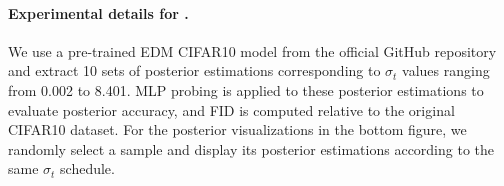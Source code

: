 \paragraph{Experimental details for .}
We use a pre-trained EDM CIFAR10 model from the official GitHub repository \citep{karras2022elucidating} and extract 10 sets of posterior estimations corresponding to $\sigma_t$ values ranging from 0.002 to 8.401. MLP probing is applied to these posterior estimations to evaluate posterior accuracy, and FID \citep{heusel2017gans} is computed relative to the original CIFAR10 dataset. For the posterior visualizations in the bottom figure, we randomly select a sample and display its posterior estimations according to the same $\sigma_t$ schedule.


